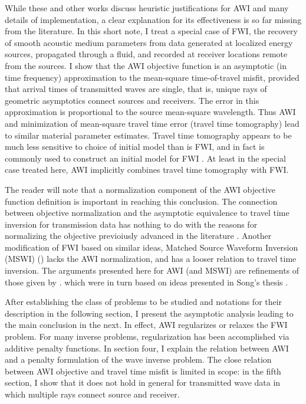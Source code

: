 While these and other works discuss heuristic justifications for AWI
and many details of implementation, a clear explanation for its
effectiveness is so far missing from the literature. In this short
note, I treat a special case of FWI, the recovery of smooth acoustic
medium parameters from data generated at localized energy sources,
propagated through a fluid, and recorded at receiver locations remote
from the sources. I show that the AWI objective function is an
asymptotic (in time frequency) approximation to the mean-square
time-of-travel misfit, provided that arrival times of transmitted
waves are single, that is, unique rays of geometric asymptotics
connect sources and receivers. The error in this approximation is
proportional to the source mean-square wavelength. Thus AWI and
minimization of mean-square travel time error (travel time tomography)
lead to similar material parameter estimates. Travel time tomography
appears to be much less sensitive to choice of initial model than is
FWI, and in fact is commonly used to construct an initial model for
FWI \cite[]{Bordingetal:87,SirguePratt:04,VirieuxOperto:09}. At least
in the special case treated here, AWI implicitly combines travel time
tomography with FWI.

The reader will
note that a normalization component of the AWI objective function
definition is important in reaching this conclusion. The connection
between objective normalization and the asymptotic equivalence to
travel time inversion for transmission data has nothing to do with the
reasons for normalizing the objective previoiusly advanced in the
literature \cite[]{Warner:16,LiAlkhalifah:21}. Another modification of
FWI based on similar ideas, Matched Source Waveform Inversion (MSWI)
(\cite{HuangSymes2015SEG,HuangSymes:Geo17}) lacks the AWI
normalization, and has a looser relation to travel time inversion. The
arguments presented here for AWI (and MSWI) are refinements of those
given by \cite{HuangSymes:Geo17}. which were in turn based on ideas
presented in Song's thesis \cite[]{Song:94c}.

After establishing the class of problems to be studied and notations
for their description in the following section, I present the
asymptotic analysis leading to the main conclusion in the next. In
effect, AWI regularizes or relaxes the FWI problem. For many inverse
problems, regularization has been accomplished via additive penalty
functions. In section four, I explain the relation between AWI and a
penalty formulation of the wave inverse problem. The
close relation between AWI objective and travel time misfit is limited
in scope: in the fifth section, I show that it does not hold in
general for transmitted wave data in which multiple rays connect
source and receiver. 

